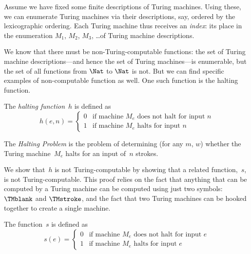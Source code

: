 \documentclass[../../../include/open-logic-section]{subfiles}
\begin{document}

\begin{explain}
Assume we have fixed some finite descriptions of Turing machines.
Using these, we can enumerate Turing machines via their descriptions,
say, ordered by the lexicographic ordering.  Each Turing machine thus
receives an \emph{index}: its place in the enumeration $M_1$, $M_2$,
$M_3$, \dots of Turing machine descriptions.

We know that there must be non-Turing-computable functions: the set of
Turing machine descriptions---and hence the set of Turing machines---is
enumerable, but the set of all functions from $\Nat$ to $\Nat$ is
not. But we can find specific examples of non-computable function as
well. One such function is the halting function.
\end{explain}

\begin{defn}
 The \emph{halting function}~$h$ is defined as
\[
h(e,n) =
\begin{cases}
  \text{0} & \text{if machine~$M_e$ does not halt for input $n$} \\
  \text{1} & \text{if machine~$M_e$ halts for input $n$}
\end{cases}
\]
\end{defn}

\begin{defn}
The \emph{Halting Problem} is the problem of determining (for any $m$, $w$)
whether the Turing machine~$M_e$ halts for an input of~$n$ strokes.
\end{defn}

\begin{explain}
We show that~$h$ is not Turing-computable by showing that a related
function,~$s$, is not Turing-computable. This proof relies on the fact
that anything that can be computed by a Turing machine can be computed
using just two symbols: $\TMblank$ and $\TMstroke$, and the fact that two
Turing machines can be hooked together to create a single machine.
\end{explain}

\begin{defn} The function~$s$ is defined as
\[
s(e) =
\begin{cases}
  \text{0} & \text{if machine~$M_e$ does not halt for input $e$} \\
  \text{1} & \text{if machine~$M_e$ halts for input $e$}
\end{cases}
\]
\end{defn}
\end{document}
